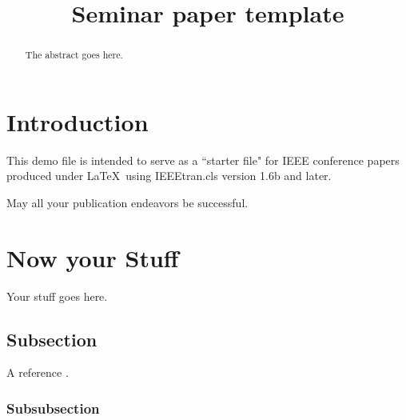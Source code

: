 \documentclass[a4paper,conference]{IEEEtran}
\begin{document}
\title{Seminar paper template}	


\author{
}


\maketitle


%
%

\begin{abstract}
The abstract goes here.
\end{abstract}


\section{Introduction}
This demo file is intended to serve as a ``starter file"
for IEEE conference papers produced under \LaTeX\ using IEEEtran.cls version
1.6b and later.

May all your publication endeavors be successful.


\section{Now your Stuff}
Your stuff goes here.

\subsection{Subsection}
A reference \cite{Akyildiz2002}.

\subsubsection{Subsubsection}


%
\end{document}
